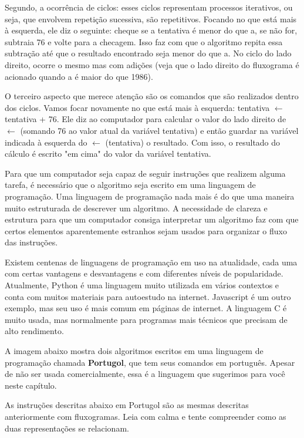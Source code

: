 Segundo, a ocorrência de ciclos: esses ciclos representam processos iterativos, ou seja, que envolvem repetição sucessiva, são repetitivos. 
Focando no que está mais à esquerda, ele diz o seguinte: cheque se a tentativa é menor do que a, se não for, subtraia 76 e volte para a checagem. Isso faz com que o algoritmo repita essa subtração até que o resultado encontrado seja menor do que a. No ciclo do lado direito, ocorre o mesmo mas com adições (veja que o lado direito do fluxograma é acionado quando a é maior do que 1986).

O terceiro aspecto que merece atenção são os comandos que são realizados dentro dos ciclos. Vamos focar novamente no que está mais à esquerda: tentativa $\leftarrow$ tentativa + 76. Ele diz ao computador para calcular o valor do lado direito de $\leftarrow$ (somando 76 ao valor atual da variável tentativa) e então guardar na variável indicada à esquerda do $\leftarrow$ (tentativa) o resultado. Com isso, o resultado do cálculo é escrito "em cima" do valor da variável tentativa.

\label{comp-know1}

Para que um computador seja capaz de seguir instruções que realizem alguma tarefa, é necessário que o algoritmo seja escrito em uma linguagem de programação. Uma linguagem de programação nada mais é do que uma maneira muito estruturada de descrever um algoritmo. A necessidade de clareza e estrutura para que um computador consiga interpretar um algoritmo faz com que certos elementos aparentemente estranhos sejam usados para organizar o fluxo das instruções.

Existem centenas de linguagens de programação em uso na atualidade, cada uma com certas vantagens e desvantagens e com diferentes níveis de popularidade. Atualmente, Python é uma linguagem muito utilizada em vários contextos e conta com muitos materiais para autoestudo na internet. Javascript é um outro exemplo, mas seu uso é mais comum em páginas de internet. A linguagem C é muito usada, mas normalmente para programas mais técnicos que precisam de alto rendimento.

A imagem abaixo mostra dois algoritmos escritos em uma linguagem de programação chamada \textbf{Portugol}, que tem seus comandos em português. Apesar de não ser usada comercialmente, essa é a linguagem que sugerimos para você neste capítulo.

As instruções descritas abaixo em Portugol são as mesmas descritas anteriormente com fluxogramas. Leia com calma e tente compreender como as duas representações se relacionam.

